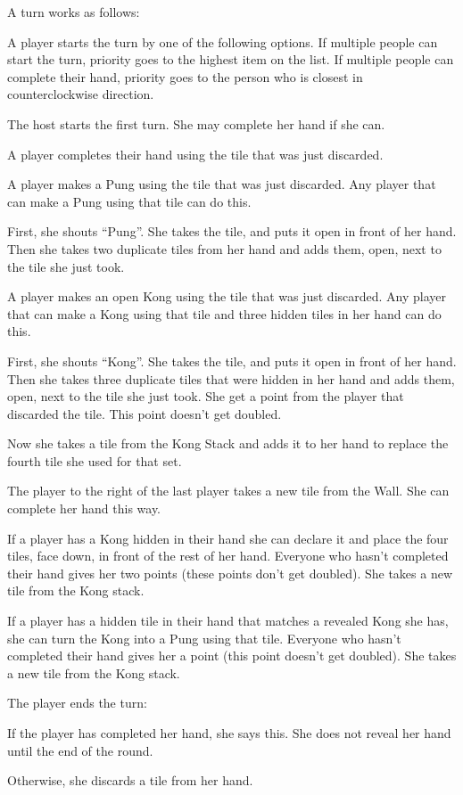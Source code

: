 \documentclass{article}
\begin{document}
A turn works as follows:
\begin{enumerate*}
    \item A player starts the turn by one of the following options. If multiple people can start the turn, priority goes to the highest item on the list. If multiple people can complete their hand, priority goes to the person who is closest in counterclockwise direction.
    \begin{enumerate*}
        \item The host starts the first turn. She may complete her hand if she can.
        \item A player completes their hand using the tile that was just discarded.
        \item A player makes a Pung using the tile that was just discarded. Any player that can make a Pung using that tile can do this.

        First, she shouts ``Pung''. She takes the tile, and puts it open in front of her hand. Then she takes two duplicate tiles from her hand and adds them, open, next to the tile she just took.
        \item A player makes an open Kong using the tile that was just discarded. Any player that can make a Kong using that tile and three hidden tiles in her hand can do this.

        First, she shouts ``Kong''. She takes the tile, and puts it open in front of her hand. Then she takes three duplicate tiles that were hidden in her hand and adds them, open, next to the tile she just took.
        She get a point from the player that discarded the tile. This point doesn't get doubled.

        Now she takes a tile from the Kong Stack and adds it to her hand to replace the fourth tile she used for that set.
        \item The player to the right of the last player takes a new tile from the Wall. She can complete her hand this way.
    \end{enumerate*}
    \item If a player has a Kong hidden in their hand she can declare it and place the four tiles, face down, in front of the rest of her hand.
    Everyone who hasn't completed their hand gives her two points (these points don't get doubled).
    She takes a new tile from the Kong stack.
    \item If a player has a hidden tile in their hand that matches a revealed Kong she has, she can turn the Kong into a Pung using that tile.
    Everyone who hasn't completed their hand gives her a point (this point doesn't get doubled).
    She takes a new tile from the Kong stack.
    \item The player ends the turn:
        \begin{enumerate*}
            \item If the player has completed her hand, she says this. She does not reveal her hand until the end of the round.
            \item Otherwise, she discards a tile from her hand.
        \end{enumerate*}
\end{enumerate*}
\end{document}
